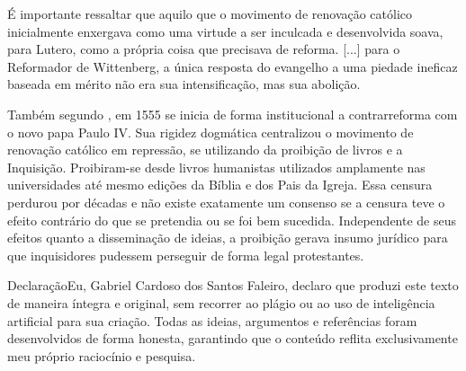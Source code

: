 \documentclass[
    article,            %
	12pt,				%
	oneside,			%
	a4paper,			%
	chapter=TITLE,		%
	section=TITLE,		%
	english,			%
	french,				%
	spanish,			%
	brazil				%
	]{abntex2}
\begin{document}
\begin{citacao}
É importante ressaltar que aquilo que o movimento de renovação católico inicialmente enxergava como uma virtude a ser inculcada e desenvolvida soava, para Lutero, como a própria coisa que precisava de reforma. [...] para o Reformador de Wittenberg, a única resposta do evangelho a uma piedade ineficaz baseada em mérito não era sua intensificação, mas sua abolição.
\end{citacao}

Também segundo , em 1555 se inicia de forma institucional a contrarreforma com o novo papa Paulo IV. Sua rigidez dogmática centralizou o movimento de renovação católico em repressão, se utilizando da proibição de livros e a Inquisição. Proibiram-se desde livros humanistas utilizados amplamente nas universidades até mesmo edições da Bíblia e dos Pais da Igreja. Essa censura perdurou por décadas e não existe exatamente um consenso se a censura teve o efeito contrário do que se pretendia ou se foi bem sucedida. Independente de seus efeitos quanto a disseminação de ideias, a proibição gerava insumo jurídico para que inquisidores pudessem perseguir de forma legal protestantes.
\cleardoublepage

\pagebreak
\noindent Declaração\linebreak Eu, Gabriel Cardoso dos Santos Faleiro, declaro que produzi este texto de maneira íntegra e original, sem recorrer ao plágio ou ao uso de inteligência artificial para sua criação. Todas as ideias, argumentos e referências foram desenvolvidos de forma honesta, garantindo que o conteúdo reflita exclusivamente meu próprio raciocínio e pesquisa.

\pagebreak
\renewcommand{\bibname}{{REFER\^ENCIAS}}


\end{document}
